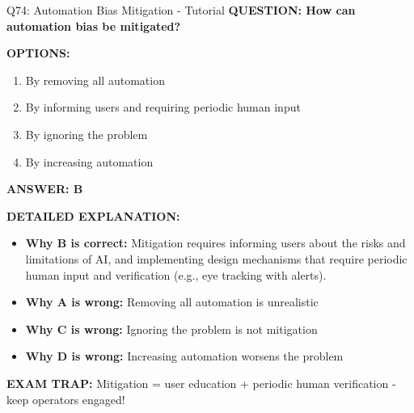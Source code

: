 \documentclass[8pt]{beamer}
\begin{document}
	\begin{frame}{Q74: Automation Bias Mitigation - Tutorial}
		\fontsize{6.5}{7.5}\selectfont
		\textbf{QUESTION: How can automation bias be mitigated?}
		
		\vspace{0.1cm}
		\textbf{OPTIONS:}
		\begin{enumerate}
			\item By removing all automation
			\item By informing users and requiring periodic human input
			\item By ignoring the problem
			\item By increasing automation
		\end{enumerate}
		
		\vspace{0.1cm}
		\textcolor{myblue}{\textbf{ANSWER: B}}
		
		\vspace{0.1cm}
		\textbf{DETAILED EXPLANATION:}
		\begin{itemize}
			\item \textbf{Why B is correct:} Mitigation requires informing users about the risks and limitations of AI, and implementing design mechanisms that require periodic human input and verification (e.g., eye tracking with alerts).
			\item \textbf{Why A is wrong:} Removing all automation is unrealistic
			\item \textbf{Why C is wrong:} Ignoring the problem is not mitigation
			\item \textbf{Why D is wrong:} Increasing automation worsens the problem
		\end{itemize}
		
		\textcolor{myred}{\textbf{EXAM TRAP:}} Mitigation = \textcolor{myblue}{user education + periodic human verification} - keep operators engaged!
	\end{frame}
	
\end{document}
